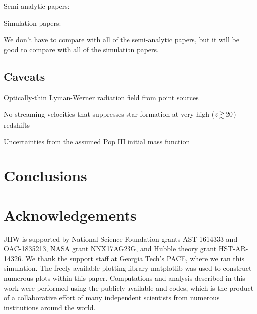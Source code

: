 \documentclass[a4paper,fleqn,usenatbib]{mnras}
\begin{document}
\li Semi-analytic papers: \citep{Tegmark97, Trenti09, Visbal18,
  Mebane18, Griffen18}

\li Simulation papers: \citep{Machacek01, Yoshida03, Wise07_UVB,
  OShea08, Muratov13}

\li We don't have to compare with all of the semi-analytic papers, but
it will be good to compare with all of the simulation papers.

\subsection{Caveats}

\li Optically-thin Lyman-Werner radiation field from point sources \citep{Schauer17}

\li No streaming velocities that suppresses star formation at very
high ($z \ga 20$) redshifts \citep{Tselia11, Greif11_Delay, Naoz12, OLeary12}

\li Uncertainties from the assumed Pop III initial mass function 

\section{Conclusions}


\section*{Acknowledgements}

JHW is supported by National Science Foundation grants AST-1614333 and
OAC-1835213, NASA grant NNX17AG23G, and Hubble theory grant
HST-AR-14326.  We thank the support staff at Georgia Tech's PACE,
where we ran this simulation.  The freely available plotting library
{\sc matplotlib} \citep{matplotlib} was used to construct numerous
plots within this paper. Computations and analysis described in this
work were performed using the publicly-available \enzo{} and \yt{}
codes, which is the product of a collaborative effort of many
independent scientists from numerous institutions around the world.










\appendix



\bsp	%
\label{lastpage}
\end{document}
